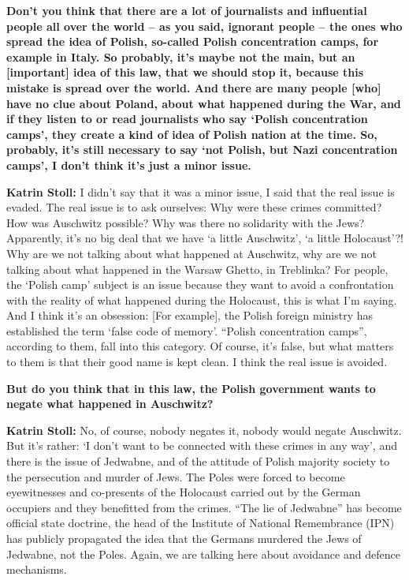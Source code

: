 \textbf{Don’t you think that there are a lot of journalists and influential people all over the world – as you said, ignorant people – the ones who spread the idea of Polish, so-called Polish concentration camps, for example in Italy. So probably, it’s maybe not the main, but an [important] idea of this law, that we should stop it, because this mistake is spread over the world. And there are many people [who] have no clue about Poland, about what happened during the War, and if they listen to or read journalists who say ‘Polish concentration camps’, they create a kind of idea of Polish nation at the time. So, probably, it’s still necessary to say ‘not Polish, but Nazi concentration camps’, I don’t think it’s just a minor issue.} 

\textbf{Katrin Stoll:} I didn’t say that it was a minor issue, I said that the real issue is evaded. The real issue is to ask ourselves: Why were these crimes committed? How was Auschwitz possible? Why was there no solidarity with the Jews? Apparently, it’s no big deal that we have ‘a little Auschwitz’, ‘a little Holocaust’?! Why are we not talking about what happened at Auschwitz, why are we not talking about what happened in the Warsaw Ghetto, in Treblinka? For people, the ‘Polish camp’ subject is an issue because they want to avoid a confrontation with the reality of what happened during the Holocaust, this is what I’m saying. And I think it’s an obsession: [For example], the Polish foreign ministry has established the term ‘false code of memory’. “Polish concentration camps”, according to them, fall into this category. Of course, it’s false, but what matters to them is that their good name is kept clean. I think the real issue is avoided.

\textbf{But do you think that in this law, the Polish government wants to negate what happened in Auschwitz?} 

\textbf{Katrin Stoll:} No, of course, nobody negates it, nobody would negate Auschwitz. But it’s rather: ‘I don’t want to be connected with these crimes in any way’, and there is the issue of Jedwabne, and of the attitude of Polish majority society to the persecution and murder of Jews. The Poles were forced to become eyewitnesses and co-presents of the Holocaust carried out by the German occupiers and they benefitted from the crimes.  “The lie of Jedwabne” has become official state doctrine, the head of the Institute of National Remembrance (IPN) has publicly propagated the idea that the Germans murdered the Jews of Jedwabne, not the Poles. Again, we are talking here about avoidance and defence mechanisms. 

